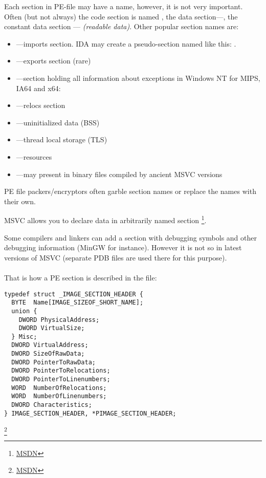 Each section in PE-file may have a name, however, it is not very important.
Often (but not always) the code section is named ,
the data section---, the constant data section ---  \emph{(readable data)}.
Other popular section names are:

\begin{itemize}
\item {}---imports section.
\ac{IDA} may create a pseudo-section named like this: .
\item {}---exports section (rare)
\item {}---section holding all information about exceptions in Windows NT for MIPS, \ac{IA64} and x64: 
\item {}---relocs section
\item {}---uninitialized data (\ac{BSS})
\item {}---thread local storage (\ac{TLS})
\item {}---resources
\item {}---may present in binary files compiled by ancient MSVC versions
\end{itemize}

PE file packers/encryptors often garble section names or replace the names with their own.

\ac{MSVC} allows you to declare data in arbitrarily named section
\footnote{\href{http://go.yurichev.com/17047}{MSDN}}.

Some compilers and linkers can add a section with debugging symbols and
other debugging information (MinGW for instance).
However it is not so in latest versions of \ac{MSVC} (separate \gls{PDB} files are used there for this purpose).\\
\\
That is how a PE section is described in the file:

\begin{lstlisting}[style=customc]
typedef struct _IMAGE_SECTION_HEADER {
  BYTE  Name[IMAGE_SIZEOF_SHORT_NAME];
  union {
    DWORD PhysicalAddress;
    DWORD VirtualSize;
  } Misc;
  DWORD VirtualAddress;
  DWORD SizeOfRawData;
  DWORD PointerToRawData;
  DWORD PointerToRelocations;
  DWORD PointerToLinenumbers;
  WORD  NumberOfRelocations;
  WORD  NumberOfLinenumbers;
  DWORD Characteristics;
} IMAGE_SECTION_HEADER, *PIMAGE_SECTION_HEADER;
\end{lstlisting}
\footnote{\href{http://go.yurichev.com/17048}{MSDN}}

